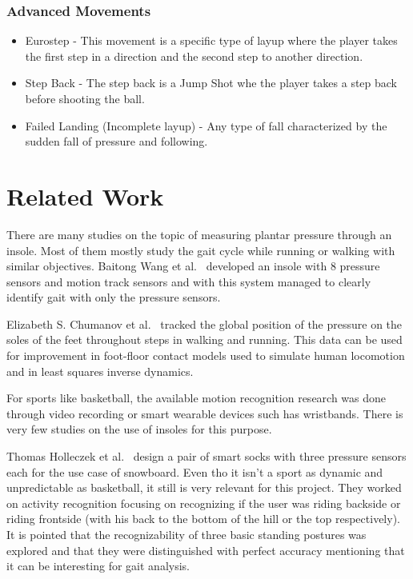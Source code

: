 \subsubsection{Advanced Movements}
\label{sssec:advanced_movements}

\begin{itemize}
  \item Eurostep - This movement is a specific type of layup where the player takes the first step in a direction and the second step to another direction.
  \item Step Back - The step back is a Jump Shot whe the player takes a step back before shooting the ball.
  \item Failed Landing (Incomplete layup) - Any type of fall characterized by the sudden fall of pressure and following.

\end{itemize}

\newpage
\section{Related Work}
\label{sec:related_work}

There are many studies on the topic of measuring plantar pressure through an insole. Most of them mostly study the gait cycle while running or walking with similar objectives. 
Baitong Wang et al.~\cite{freewalker} developed an insole with 8 pressure sensors and motion track sensors and with this system managed to clearly identify gait with only the pressure 
sensors.

Elizabeth S. Chumanov et al.~\cite{posDuringWalking} tracked the global position of the pressure on the soles of the feet throughout steps in walking and running. This data can be used 
for improvement in foot-floor contact models used to simulate human locomotion and in least squares inverse dynamics.


For sports like basketball, the available motion recognition research was done through video recording or smart wearable devices such has wristbands. There is very few studies on the 
use of insoles for this purpose. 

Thomas Holleczek et al.~\cite{snowboard} design a pair of smart socks with three pressure sensors each for the use case of snowboard. Even tho it isn't a sport as dynamic and unpredictable 
as basketball, it still is very relevant for this project. They worked on activity recognition focusing on recognizing if the user was riding backside or riding frontside (with his 
back to the bottom of the hill or the top respectively). It is pointed that the recognizability of three basic standing postures was explored and that they were distinguished with perfect accuracy 
mentioning that it can be interesting for gait analysis.


